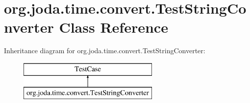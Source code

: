 \hypertarget{classorg_1_1joda_1_1time_1_1convert_1_1_test_string_converter}{\section{org.\-joda.\-time.\-convert.\-Test\-String\-Converter Class Reference}
\label{classorg_1_1joda_1_1time_1_1convert_1_1_test_string_converter}
}
Inheritance diagram for org.\-joda.\-time.\-convert.\-Test\-String\-Converter\-:\begin{figure}[H]
\begin{center}
\leavevmode
\includegraphics[height=2.000000cm]{classorg_1_1joda_1_1time_1_1convert_1_1_test_string_converter}
\end{center}
\end{figure}
